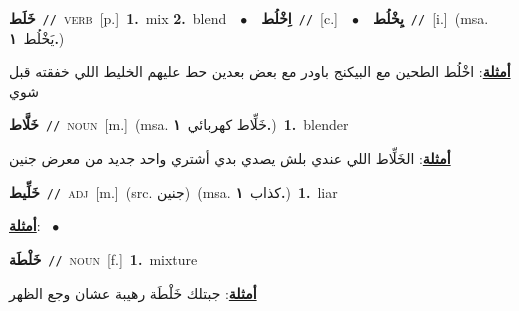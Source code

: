 \documentclass[10pt,a4paper,twoside]{article} %
\begin{document}
\begin{multicols}{2}
{\setlength\topsep{0pt}\textbf{\foreignlanguage{arabic}{خَلَط}}\ {\color{gray}\texttt{//}\color{black}}\ \textsc{verb}\ [p.]\ \textbf{1.}~mix  \textbf{2.}~blend\ \ $\bullet$\ \ \setlength\topsep{0pt}\textbf{\foreignlanguage{arabic}{اِخْلُط}}\ {\color{gray}\texttt{//}\color{black}}\ [c.]\ \ $\bullet$\ \ \setlength\topsep{0pt}\textbf{\foreignlanguage{arabic}{يِخْلُط}}\ {\color{gray}\texttt{//}\color{black}}\ [i.]\ \color{gray}(msa. \foreignlanguage{arabic}{يَخْلُط}~\foreignlanguage{arabic}{\textbf{١.}})\color{black}\  \begin{flushright}\color{gray}\foreignlanguage{arabic}{\textbf{\underline{\foreignlanguage{arabic}{أمثلة}}}: اخْلُط الطحين مع البيكنج باودر مع بعض بعدين حط عليهم الخليط اللي خفقته قبل شوي}\end{flushright}\color{black}} \vspace{2mm}

{\setlength\topsep{0pt}\textbf{\foreignlanguage{arabic}{خَلَّاط}}\ {\color{gray}\texttt{//}\color{black}}\ \textsc{noun}\ [m.]\ \color{gray}(msa. \foreignlanguage{arabic}{خَلِّاط كهربائي}~\foreignlanguage{arabic}{\textbf{١.}})\color{black}\ \textbf{1.}~blender\  \begin{flushright}\color{gray}\foreignlanguage{arabic}{\textbf{\underline{\foreignlanguage{arabic}{أمثلة}}}: الخَلِّاط اللي عندي بلش يصدي بدي أشتري واحد جديد من معرض جنين}\end{flushright}\color{black}} \vspace{2mm}

{\setlength\topsep{0pt}\textbf{\foreignlanguage{arabic}{خَلِّيط}}\ {\color{gray}\texttt{//}\color{black}}\ \textsc{adj}\ [m.]\ (src. \color{gray}\foreignlanguage{arabic}{جنين}\color{black})\ \color{gray}(msa. \foreignlanguage{arabic}{كذاب}~\foreignlanguage{arabic}{\textbf{١.}})\color{black}\ \textbf{1.}~liar\  \begin{flushright}\color{gray}\foreignlanguage{arabic}{\textbf{\underline{\foreignlanguage{arabic}{أمثلة}}}: \ $\bullet$\ \  }\end{flushright}\color{black}} \vspace{2mm}

{\setlength\topsep{0pt}\textbf{\foreignlanguage{arabic}{خَلْطَة}}\ {\color{gray}\texttt{//}\color{black}}\ \textsc{noun}\ [f.]\ \textbf{1.}~mixture\  \begin{flushright}\color{gray}\foreignlanguage{arabic}{\textbf{\underline{\foreignlanguage{arabic}{أمثلة}}}: جبتلك خَلْطَة رهيبة عشان وجع الظهر}\end{flushright}\color{black}} \vspace{2mm}


\end{multicols}
\end{document}
